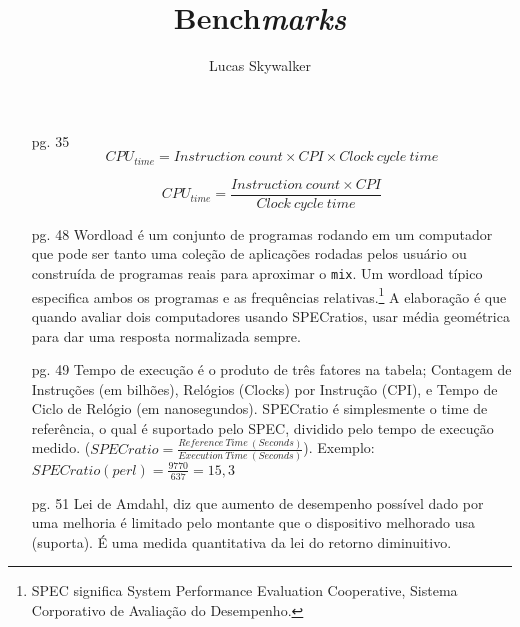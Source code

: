 \documentclass{article}
\author{Lucas Skywalker}
\title{Bench\textit{marks}}
\begin{document}
\maketitle

\begin{enumerate}

\item[pg. 35] $$CPU_{time} = Instruction\ count \times CPI \times Clock\ cycle\ 
time$$

$$CPU_{time} = \frac{Instruction\ count \times CPI}{Clock\ cycle\ time}$$

\item[pg. 48] Wordload é um conjunto de programas rodando em um computador que 
pode 
ser tanto uma coleção de aplicações rodadas pelos usuário ou construída de 
programas reais para aproximar o \verb|mix|. Um wordload típico especifica 
ambos os programas e as frequências relativas.\footnote{SPEC significa System 
Performance Evaluation Cooperative, Sistema Corporativo de Avaliação do 
Desempenho.} A elaboração é que quando avaliar dois computadores usando 
SPECratios, usar média geométrica para dar uma resposta normalizada sempre.

\item[pg. 49] Tempo de execução é o produto de três fatores na tabela; Contagem
de Instruções (em bilhões), Relógios (Clocks) por Instrução (CPI), e Tempo de
Ciclo de Relógio (em nanosegundos). SPECratio é simplesmente o time de
referência, o qual é suportado pelo SPEC, dividido pelo tempo de execução
medido. ($SPECratio = \frac{Reference\ Time\ (Seconds)}{Execution\ Time\
(Seconds)}$). Exemplo: $SPECratio(perl) = \frac{9770}{637} = 15,3$



\item[pg. 51] Lei de Amdahl, diz que aumento de desempenho possível dado por 
uma melhoria é limitado pelo montante que o dispositivo melhorado usa (suporta).
É uma medida quantitativa da lei do retorno diminuitivo.


\end{enumerate}
\end{document}
